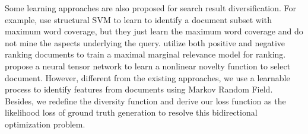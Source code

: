 \documentclass[review]{elsarticle}
\begin{document}
{%


Some learning approaches are also proposed for search result diversification. For example, \cite{zhu2014learning} use structural SVM to learn to identify a document subset with maximum word coverage, but they just learn the maximum word coverage and do not mine the aspects underlying the query. \cite{Xia:2015:LMM:2766462.2767710} utilize both positive and negative ranking documents to train a maximal marginal relevance model for ranking. \cite{Xia:2016:MDN:2911451.2911498} propose a neural tensor network to learn a nonlinear novelty function to select document. However, different from the existing approaches, we use a learnable process to identify features from documents using Markov Random Field. Besides, we redefine the diversity function and derive our loss function as the likelihood loss of ground truth generation to resolve this bidirectional optimization problem.}




\end{document}
